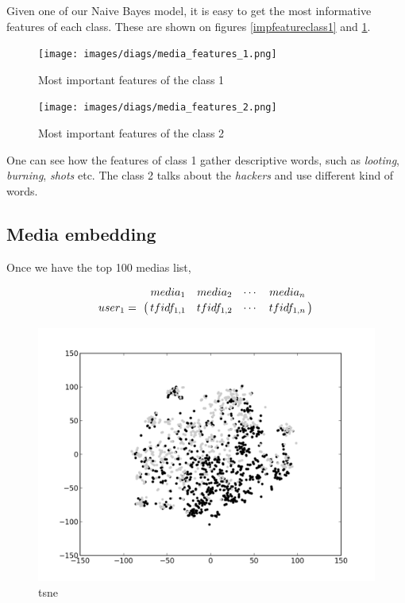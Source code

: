 \documentclass[a4paper,12pt]{report}
\begin{document}
Given one of our Naive Bayes model, it is easy to get the most informative features of each class. These are shown on figures \ref{impfeatureclass1} and \ref{impfeatureclass2}.

\begin{figure}[H]
\begin{minipage}[t]{0.5\textwidth}
\begin{center}
	\texttt{[image: images/diags/media\_features\_1.png]}
	\caption{Most important features of the class 1}
	\label{impfeatureclass1}
\end{center}
\end{minipage}
\hfill
\begin{minipage}[t]{0.42\textwidth}
\begin{center}
	\texttt{[image: images/diags/media\_features\_2.png]}
	\caption{Most important features of the class 2}
	\label{impfeatureclass2}
\end{center}
\end{minipage}
\end{figure}

One can see how the features of class 1 gather descriptive words, such as \emph{looting}, \emph{burning}, \emph{shots} etc. The class 2 talks about the \emph{hackers} and use different kind of words.

\newpage
\subsection{Media embedding}
Once we have the top 100 medias list, 

\[
\bordermatrix{~ & media_1 & media_2 & \cdots & media_n \cr user_1 =  & tfidf_{1,1} & tfidf_{1,2} & \cdots & tfidf_{1,n} \cr}
\]

\begin{figure}[H]
\centering
\includegraphics[width=\textwidth]{images/plots/media_tsne.png}
\caption{tsne}
\end{figure}
\end{document}
